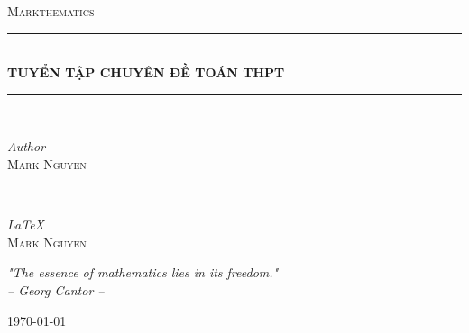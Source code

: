 \begin{titlepage}

    \newcommand{\HRule}{\rule{\linewidth}{0.5mm}} 
    \center
    
    
    \textsc{\LARGE Markthematics}\\[5cm]
    
    
    \HRule\\[0.4cm]
    
    {\huge\bfseries TUYỂN TẬP CHUYÊN ĐỀ TOÁN THPT}\\[0.1cm]
    
    \HRule\\[1.5cm]
    
    
    \begin{minipage}{0.4\textwidth}
        \begin{flushleft}
            \large
            \textit{Author}\\
            \textsc{Mark Nguyen}
        \end{flushleft}
    \end{minipage}
    ~
    \begin{minipage}{0.4\textwidth}
        \begin{flushright}
            \large
            \textit{\LaTeX}\\
            \textsc{Mark Nguyen}
        \end{flushright}
    \end{minipage}
    

    \vfill\vfill

    \textit{"The essence of mathematics lies in its freedom."}\\[0.25cm]
    \textit{-- Georg Cantor --}
    
    
    \vfill\vfill\vfill
    {\large\today}

    \vfill
    
\end{titlepage}